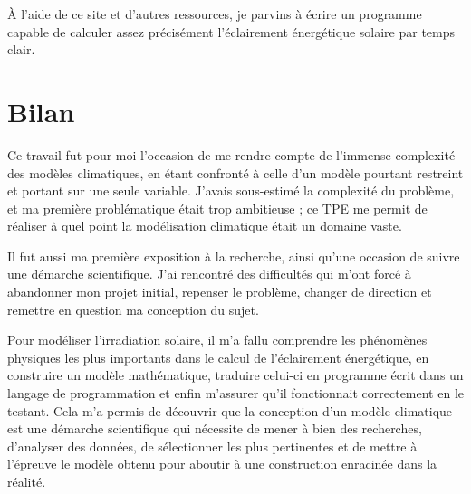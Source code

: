 \documentclass[12pt,a4paper]{article}
\begin{document}
À l'aide de ce site et d'autres ressources, je parvins à écrire un programme capable de calculer assez précisément l'éclairement énergétique solaire par temps clair.


\section{Bilan}
Ce travail fut pour moi l'occasion de me rendre compte de l'immense complexité des modèles climatiques, en étant confronté à celle d'un modèle pourtant restreint et portant sur une seule variable.
J'avais sous-estimé la complexité du problème, et ma première problématique était trop ambitieuse ; ce TPE me permit de réaliser à quel point la modélisation climatique était un domaine vaste.

Il fut aussi ma première exposition à la recherche, ainsi qu'une occasion de suivre une démarche scientifique.
J'ai rencontré des difficultés qui m'ont forcé à abandonner mon projet initial, repenser le problème, changer de direction et remettre en question ma conception du sujet.

Pour modéliser l'irradiation solaire, il m'a fallu comprendre les phénomènes physiques les plus importants dans le calcul de l'éclairement énergétique, en construire un modèle mathématique, traduire celui-ci en programme écrit dans un langage de programmation et enfin m'assurer qu'il fonctionnait correctement en le testant.
Cela m'a permis de découvrir que la conception d'un modèle climatique est une démarche scientifique qui nécessite de mener à bien des recherches, d'analyser des données, de sélectionner les plus pertinentes et de mettre à l'épreuve le modèle obtenu pour aboutir à une construction enracinée dans la réalité.
\end{document}
